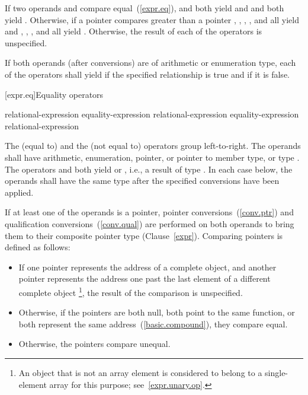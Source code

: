 \pnum
If two operands  and  compare equal~(\ref{expr.eq}),
 and  both yield  and  and
 both yield . Otherwise, if a pointer 
compares greater than a pointer , , ,
, and  all yield  and ,
, , and  all yield .
Otherwise, the result of each of the operators is unspecified.

\pnum
If both operands (after conversions) are of arithmetic or enumeration type, each
of the operators shall yield  if the specified relationship is true
and  if it is false.

[expr.eq]{Equality operators}%
%
%

\begin{bnf}
\br
    relational-expression\br
    equality-expression \terminal{==} relational-expression\br
    equality-expression \terminal{!=} relational-expression
\end{bnf}

\pnum
The \tcode{==} (equal to) and the \tcode{!=} (not equal to) operators
group left-to-right. The operands shall have arithmetic, enumeration, pointer,
or pointer to member type, or type . The operators
\tcode{==} and \tcode{!=} both yield  or , i.e., a
result of type . In each case below, the operands shall have the
same type after the specified conversions have been applied.

%
%
\pnum
If at least one of the operands is a pointer, pointer
conversions~(\ref{conv.ptr}) and qualification conversions~(\ref{conv.qual})
are performed on both operands to bring them to their composite pointer type
(Clause~\ref{expr}). Comparing pointers is defined as follows:

\begin{itemize}
\item
If one pointer represents the address of a complete object, and another
pointer represents the address one past the last element of a different
complete object \footnote{An object that is not an array element is
considered to belong to a single-element array for this purpose;
see~\ref{expr.unary.op}.}, the result of the comparison is unspecified.
\item
Otherwise, if the pointers are both null, both point to the same
%
function, or both represent the same address~(\ref{basic.compound}),
they compare equal.
\item
Otherwise, the pointers compare unequal.
\end{itemize}


